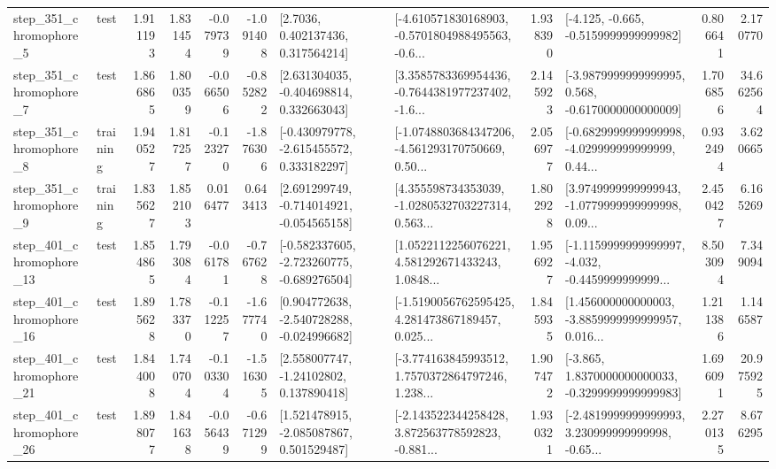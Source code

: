 \begin{tabular}{llrrrrllrlrr}
   step\_351\_chromophore\_5 &      test &      1.911193 &    1.831454 &     -0.079739 & -1.091408 &          [2.7036, 0.402137436, 0.317564214] &  [-4.610571830168903, -0.5701804988495563, -0.6... &       1.938390 &              [-4.125, -0.665, -0.5159999999999982] &            0.806641 &          2.170770 \\
   step\_351\_chromophore\_7 &      test &      1.866865 &    1.800359 &     -0.066506 & -0.852822 &    [2.631304035, -0.404698814, 0.332663043] &  [3.3585783369954436, -0.7644381977237402, -1.6... &       2.145923 &  [-3.9879999999999995, 0.568, -0.6170000000000009] &            1.706856 &         34.662564 \\
   step\_351\_chromophore\_8 &  training &      1.940527 &    1.817257 &     -0.123270 & -1.876306 &   [-0.430979778, -2.615455572, 0.333182297] &  [-1.0748803684347206, -4.561293170750669, 0.50... &       2.056977 &  [-0.6829999999999998, -4.029999999999999, 0.44... &            0.932494 &          3.620665 \\
   step\_351\_chromophore\_9 &  training &      1.835627 &    1.852103 &      0.016477 &  0.643413 &   [2.691299749, -0.714014921, -0.054565158] &  [4.355598734353039, -1.0280532703227314, 0.563... &       1.802928 &  [3.9749999999999943, -1.0779999999999998, 0.09... &            2.450427 &          6.165269 \\
  step\_401\_chromophore\_13 &      test &      1.854865 &    1.793084 &     -0.061781 & -0.767628 &  [-0.582337605, -2.723260775, -0.689276504] &  [1.0522112256076221, 4.581292671433243, 1.0848... &       1.956927 &  [-1.1159999999999997, -4.032, -0.4459999999999... &            8.503094 &          7.349094 \\
  step\_401\_chromophore\_16 &      test &      1.895628 &    1.783370 &     -0.112257 & -1.677740 &   [0.904772638, -2.540728288, -0.024996682] &  [-1.5190056762595425, 4.281473867189457, 0.025... &       1.845935 &  [1.456000000000003, -3.8859999999999957, 0.016... &            1.211386 &          1.146587 \\
  step\_401\_chromophore\_21 &      test &      1.844008 &    1.740704 &     -0.103304 & -1.516305 &     [2.558007747, -1.24102802, 0.137890418] &  [-3.774163845993512, 1.7570372864797246, 1.238... &       1.907472 &  [-3.865, 1.8370000000000033, -0.3299999999999983] &            1.696091 &         20.975925 \\
  step\_401\_chromophore\_26 &      test &      1.898077 &    1.841638 &     -0.056439 & -0.671299 &    [1.521478915, -2.085087867, 0.501529487] &  [-2.143522344258428, 3.872563778592823, -0.881... &       1.930321 &  [-2.4819999999999993, 3.230999999999998, -0.65... &            2.270135 &          8.676295 \\

\end{tabular}
